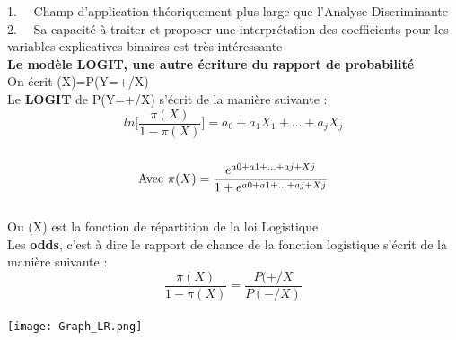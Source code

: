 \documentclass{article}
\begin{document}
1.~~ Champ d’application théoriquement plus large que l’Analyse Discriminante \\

2. ~~Sa capacité à traiter et proposer une interprétation des coefficients pour les variables explicatives binaires est très intéressante\\

\textbf {Le modèle LOGIT, une autre écriture du rapport de probabilité} \\

On écrit \pi(X)=P(Y=+/X) \\

Le \textbf{LOGIT} de P(Y=+/X) s'écrit de la manière suivante :\\

$$ln\bigg[\frac{\pi(X)}{1-\pi(X)}\bigg] = a_{0}+a_{1}X_{1}+ ... +a_{j}X_{j}$$\\

$$\textnormal {Avec }\\
\\ \pi(X)=\frac{e^{a0+a1+...+aj+Xj}}{1+e^{a0+a1+...+aj+Xj}}$$\\ 

Ou \pi(X) \textnormal{est la fonction de répartition de la loi Logistique}\\

Les \textbf{odds}, c'est à dire le rapport de chance de la fonction logistique s'écrit de la manière suivante : \\

$$\frac{\pi(X)}{1-\pi(X)} = \frac{P(+/X}{P(-/X)}$$\\
\texttt{[image: Graph\_LR.png]}
\end{document}
